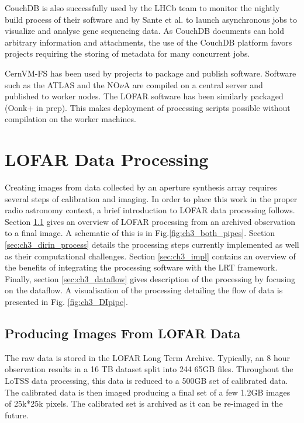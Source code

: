 CouchDB is also successfully used by the LHCb team to monitor the nightly build process of their software\cite{clemencic2014new} and by Sante et al.\cite{sante2010development} to launch asynchronous jobs to visualize and analyse gene sequencing data. As CouchDB documents can hold arbitrary information and attachments, the use of the CouchDB platform favors projects requiring the storing of metadata for many concurrent jobs. 

CernVM-FS\cite{cvmfs2008} has been used by projects to package and publish software. Software such as the ATLAS \cite{cvmfsatlas} and the NO$\nu$A \cite{cvmfsnova} are compiled on a central server and published to worker nodes. The LOFAR software has been similarly packaged (Oonk+ in prep). This makes deployment of processing scripts possible without compilation on the worker machines. 

\section{LOFAR Data Processing}\label{sec:ch3_lofar_red}

Creating images from data collected by an aperture synthesis array\cite{aperturesynth} requires several steps of calibration and imaging. In order to place this work in the proper radio astronomy context, a brief introduction to LOFAR data processing follows. Section \ref{sec:ch3_image} gives an overview of LOFAR processing from an archived observation to a final image. A schematic of this is in Fig.\ref{fig:ch3_both_pipes}. Section \ref{sec:ch3_dirin_process} details the processing steps currently implemented as well as their computational challenges. Section \ref{sec:ch3_impl} contains an overview of the benefits of integrating the processing software with the LRT framework.  Finally, section \ref{sec:ch3_dataflow} gives description of the processing by focusing on the dataflow. A visualisation of the processing detailing the flow of data is presented in Fig. \ref{fig:ch3_DIpipe}.


\subsection{Producing Images From LOFAR Data}\label{sec:ch3_image}

The raw data is stored in the LOFAR Long Term Archive. Typically, an 8 hour observation results in a 16 TB dataset split into 244 65GB files. Throughout the LoTSS data processing, this data is reduced to a 500GB set of calibrated data. The calibrated data is then imaged producing a final set of a few 1.2GB images of 25k*25k pixels. The calibrated set is archived as it can be re-imaged in the future. 


